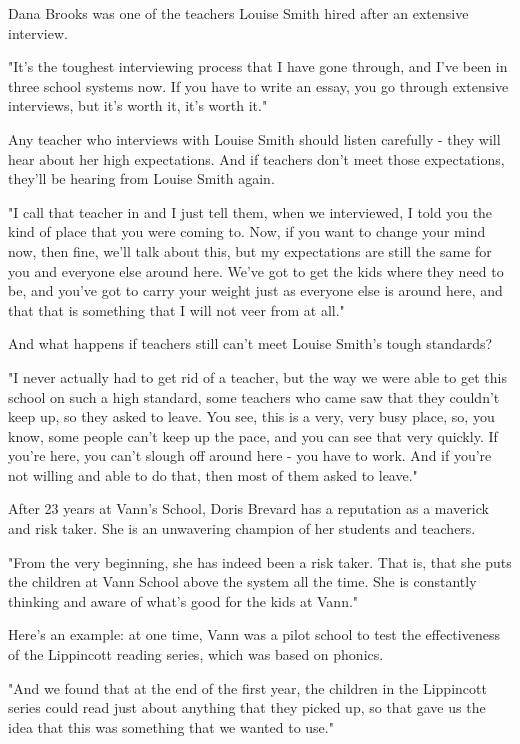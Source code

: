 Dana Brooks was one of the teachers Louise Smith hired after an extensive interview.

"It's the toughest interviewing process that I have gone through, and I've been in three school systems now. If you have to write an essay, you go through extensive interviews, but it's worth it, it's worth it."

Any teacher who interviews with Louise Smith should listen carefully - they will hear about her high expectations. And if teachers don't meet those expectations, they'll be hearing from Louise Smith again.

"I call that teacher in and I just tell them, when we interviewed, I told you the kind of place that you were coming to. Now, if you want to change your mind now, then fine, we'll talk about this, but my expectations are still the same for you and everyone else around here. We've got to get the kids where they need to be, and you've got to carry your weight just as everyone else is around here, and that that is something that I will not veer from at all."

And what happens if teachers still can't meet Louise Smith's tough standards?

"I never actually had to get rid of a teacher, but the way we were able to get this school on such a high standard, some teachers who came saw that they couldn't keep up, so they asked to leave. You see, this is a very, very busy place, so, you know, some people can't keep up the pace, and you can see that very quickly. If you're here, you can't slough off around here - you have to work. And if you're not willing and able to do that, then most of them asked to leave."

After 23 years at Vann's School, Doris Brevard has a reputation as a maverick and risk taker. She is an unwavering champion of her students and teachers.

"From the very beginning, she has indeed been a risk taker. That is, that she puts the children at Vann School above the system all the time. She is constantly thinking and aware of what's good for the kids at Vann."

Here's an example: at one time, Vann was a pilot school to test the effectiveness of the Lippincott reading series, which was based on phonics.

"And we found that at the end of the first year, the children in the Lippincott series could read just about anything that they picked up, so that gave us the idea that this was something that we wanted to use."

